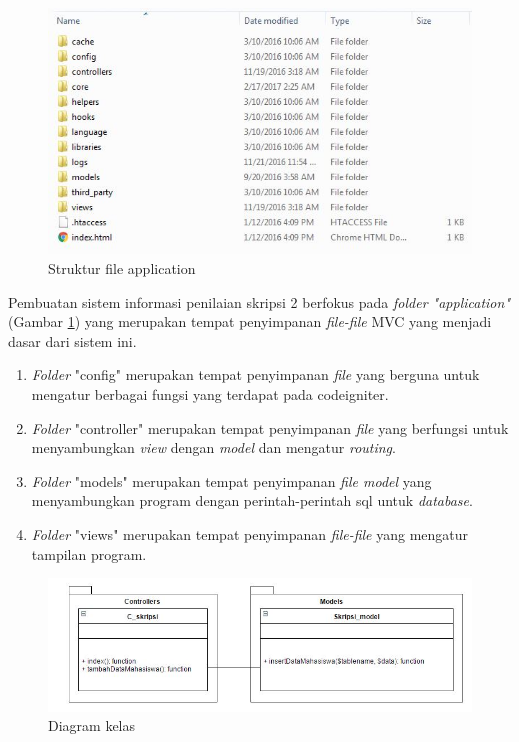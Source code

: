 		\begin{figure}[H]
			\centering
			\includegraphics[scale=1.0]{Gambar/strukturFileApp}
			\caption{Struktur file application}
			\label{fig: strukturFileApp}
		\end{figure}
		
		
		Pembuatan sistem informasi penilaian skripsi 2 berfokus pada \textit{folder "application"} (Gambar \ref{fig: strukturFileApp}) yang merupakan tempat penyimpanan \textit{file-file} MVC yang menjadi dasar dari sistem ini.
		
		\begin{enumerate}
			\item \textit{Folder} "config" merupakan tempat penyimpanan \textit{file} yang berguna untuk mengatur berbagai fungsi yang terdapat pada codeigniter.
			\item \textit{Folder} "controller" merupakan tempat penyimpanan \textit{file} yang berfungsi untuk menyambungkan \textit{view} dengan \textit{model} dan mengatur \textit{routing}.
			\item \textit{Folder} "models" merupakan tempat penyimpanan \textit{file model} yang menyambungkan program dengan perintah-perintah sql untuk \textit{database}.
			\item \textit{Folder} "views" merupakan tempat penyimpanan \textit{file-file} yang mengatur tampilan program.
		\end{enumerate}
		
		\begin{figure}[H]
			\centering
			\includegraphics[scale=0.75]{Gambar/diagKelas}
			\caption{Diagram kelas}
			\label{fig: diagramKelas}
		\end{figure}
		
